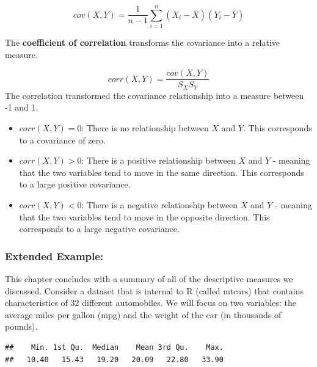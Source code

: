 \documentclass[
]{book}
\newenvironment{Shaded}{\begin{snugshade}}{\end{snugshade}}
\newcommand{\CommentTok}[1]{\textcolor[rgb]{0.56,0.35,0.01}{\textit{#1}}}
\newcommand{\FunctionTok}[1]{\textcolor[rgb]{0.13,0.29,0.53}{\textbf{#1}}}
\newcommand{\NormalTok}[1]{#1}
\newcommand{\OtherTok}[1]{\textcolor[rgb]{0.56,0.35,0.01}{#1}}
\newcommand{\SpecialCharTok}[1]{\textcolor[rgb]{0.81,0.36,0.00}{\textbf{#1}}}
\begin{document}
\[cov(X,Y)=\frac{1}{n-1}\sum\limits_{i=1}^n(X_i-\bar{X})(Y_i-\bar{Y})\]

The \textbf{coefficient of correlation} transforms the covariance into a relative measure.

\[corr(X,Y)=\frac{cov(X,Y)}{S_{X}S_{Y}}\]
The correlation transformed the covariance relationship into a measure between -1 and 1.

\begin{itemize}
\item
  \(corr(X,Y)=0\): There is no relationship between \(X\) and \(Y\). This corresponds to a covariance of zero.
\item
  \(corr(X,Y)>0\): There is a positive relationship between \(X\) and \(Y\) - meaning that the two variables tend to move in the same direction. This corresponds to a large positive covariance.
\item
  \(corr(X,Y)<0\): There is a negative relationship between \(X\) and \(Y\) - meaning that the two variables tend to move in the opposite direction. This corresponds to a large negative covariance.
\end{itemize}

\subsubsection*{Extended Example:}\label{extended-example}

This chapter concludes with a summary of all of the descriptive measures we discussed. Consider a dataset that is internal to R (called mtcars) that contains characteristics of 32 different automobiles. We will focus on two variables: the average miles per gallon (mpg) and the weight of the car (in thousands of pounds).

\begin{Shaded}
\end{Shaded}

\begin{verbatim}
##    Min. 1st Qu.  Median    Mean 3rd Qu.    Max. 
##   10.40   15.43   19.20   20.09   22.80   33.90
\end{verbatim}
\end{document}
